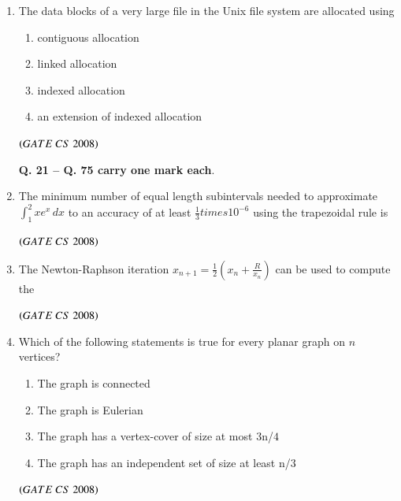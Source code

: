 \documentclass[journal]{IEEEtran}
\numberwithin{equation}{enumi}
\numberwithin{figure}{enumi}
\begin{document}
\begin{enumerate}
\item The data blocks of a very large file in the Unix file system are allocated using
\begin{enumerate}
    \item contiguous allocation
    \item  linked allocation 
    \item indexed allocation 
    \item an extension of indexed allocation 
\end{enumerate}
\hfill $\left(GATE\ CS\  2008\right)$
 

\begin{center}
\textbf{Q. 21 -- Q. 75 carry one mark each}.
\end{center}
\item The minimum number of equal length subintervals needed to approximate $\int_{1}^{2} x e^x \,dx$ to an accuracy of at least $\frac{1}{3}times 10^{-6}$ using the trapezoidal rule is
\begin{enumerate}
\end{enumerate}
\hfill $\left(GATE\ CS\  2008\right)$

\item The Newton-Raphson iteration $x_{n+1}=\frac{1}{2}(x_n+\frac{R}{x_n})$ can be used to compute the 
\begin{enumerate}
\end{enumerate}
\hfill $\left(GATE\ CS\  2008\right)$

\item  Which of the following statements is true for every planar graph on $n$ vertices? 
\begin{enumerate}
    \item  The graph is connected
    \item  The graph is Eulerian
    \item  The graph has a vertex-cover of size at most $3$n/$4$
    \item The graph has an independent set of size at least n/$3$
\end{enumerate}
\hfill $\left(GATE\ CS\  2008\right)$
 


\end{enumerate}
\end{document}
